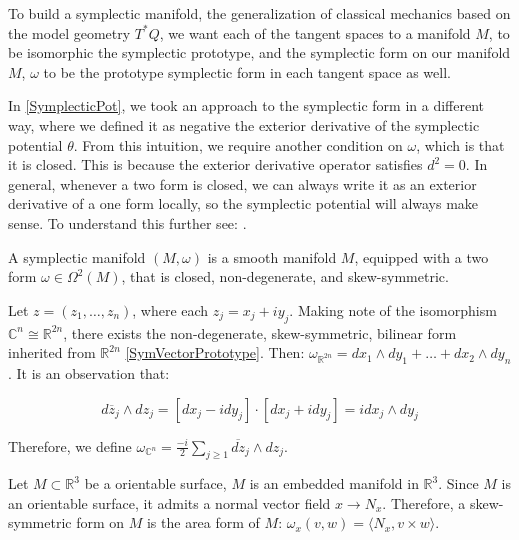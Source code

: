 \begin{remark}
To build a symplectic manifold, the generalization of classical mechanics based on the model geometry $T^{*} Q$, we want each of the tangent spaces to a manifold $M$, to be isomorphic the symplectic prototype, and the symplectic form on our manifold $M$, $\omega$ to be the prototype symplectic form in each tangent space as well.
\end{remark}

\begin{remark}
In \ref{SymplecticPot}, we took an approach to the symplectic form in a different way, where we defined it as negative the exterior derivative of the symplectic potential $\theta$. From this intuition, we require another condition on $\omega$, which is that it is closed. This is because the exterior derivative operator satisfies $d^2 = 0$. In general, whenever a two form is closed, we can always write it as an exterior derivative of a one form locally, so the symplectic potential will always make sense. To understand this further see: \textcite{Terek2020}. 
\end{remark}

\begin{defn}
A symplectic manifold $(M, \omega)$ is a smooth manifold $M$, equipped with a two form $\omega \in \Omega^2(M)$, that is closed, non-degenerate, and skew-symmetric. 
\end{defn}

\begin{example}
\label{ComplexForm}
Let $z = (z_{1}, \dots, z_{n})$, where each $z_{j} = x_{j} + i y_{j}$. 
Making note of the isomorphism $\mathbb{C}^{n} \cong \mathbb{R}^{2n}$, there exists the non-degenerate, skew-symmetric, bilinear form inherited from $\mathbb{R}^{2n}$ \ref{SymVectorPrototype}. Then: $\omega_{\mathbb{R}^{2n}} = dx_{1} \wedge dy_{1} + \dots + dx_{2} \wedge dy_{n}$. It is an observation that:

$$d \overline{z}_{j} \wedge dz_{j} = \left[ dx_{j} - i dy_{j} \right] \cdot \left[ dx_{j} + i dy_{j} \right] = i dx_{j} \wedge dy_{j}$$

\noindent Therefore, we define $\omega_{\mathbb{C}^{n}} = \frac{-i}{2} \sum_{j \geq 1} \overline{dz}_{j} \wedge dz_{j}$. 
\end{example}

\begin{example}
\label{SurfaceForm}
Let $M \subset \mathbb{R}^3$ be a orientable surface, $M$ is an embedded manifold in $\mathbb{R}^{3}$. Since $M$ is an orientable surface, it admits a normal vector field $x \to N_{x}$. Therefore, a skew-symmetric form on $M$ is the area form of $M$: $\omega_{x}(v,w) = \langle N_{x}, v \times w \rangle$. 
\end{example}

